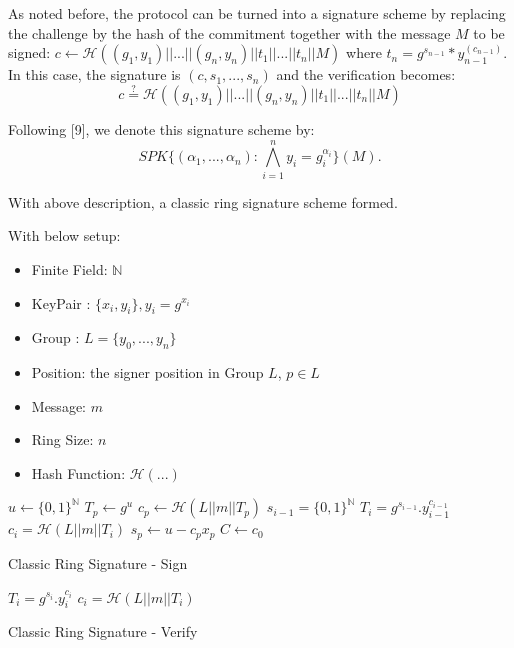 \documentclass[11pt]{article}
\begin{document}
As noted before, the protocol can be turned into a signature scheme by
replacing the challenge by the hash of the commitment together with the message $M$ to be signed: $c \leftarrow \mathcal{H}((g_1,y_1)||...||(g_n,y_n)||t_1||...||t_n||M)$ where $t_n = g^{s_{n-1}}*y_{n-1}^(c_{n-1})$. In this case, the signature is $(c,s_1,...,s_n)$ and the verification becomes:
\begin{equation}
c \stackrel{?}{=} \mathcal{H}((g_1,y_1)||...||(g_n,y_n)||t_1||...||t_n||M)
\end{equation}

Following [9], we denote this signature scheme by:
\begin{equation}
SPK\{(\alpha_1,...,\alpha_n) : \bigwedge_{i=1}^{n}{y_i = g_i^{\alpha_i}}\}(M).
\end{equation}

With above description, a classic ring signature scheme formed.

With below setup:
\begin{itemize}
\item
Finite Field: $\mathbb{N}$
\item
KeyPair : $\{x_i, y_i\},  y_i = g^{x_i}$
\item
Group : $L=\{y_0,...,y_n\}$
\item
Position: the signer position in Group $L$, $p \in L$
\item
Message: $m$
\item
Ring Size: $n$
\item
Hash Function: $\mathcal{H}(...)$
\end{itemize}

\begin{algorithm}
\DontPrintSemicolon
{}

$u \gets \{0, 1\}^\mathbb{N}$\;
$T_p \gets g^u$\;
$ c_p \gets \mathcal{H}(L || m || T_p) $\;
 {
  $s_{i-1} = \{0,1\}^\mathbb{N}$\;
  $T_i = g^{s_{i-1}} . y_{i-1}^{c_{i-1}}$\;
  $c_i = \mathcal{H}(L || m || T_i)$\;
}
$s_p \gets u - c_{p}{x_p}$\;
$C \gets c_0$\;
\;
\caption{Classic Ring Signature - Sign}
\label{algo:classic-sign}
\end{algorithm}
\begin{algorithm}
\DontPrintSemicolon
{}
 {
  $T_i = g^{s_i} . y_i^{c_i}$\;
  $c_i = \mathcal{H}(L || m || T_i)$\;
}
\;
\caption{Classic Ring Signature - Verify}
\label{algo:classic-verify}
\end{algorithm}
\end{document}
